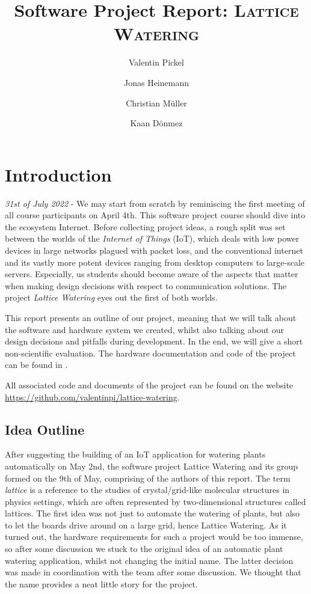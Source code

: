 \documentclass[acmtog, language=english, nonacm]{acmart}
\title{Software Project Report: \textsc{Lattice Watering}}
\author{Valentin Pickel}
\author{Jonas Heinemann}
\author{Christian Müller}
\author{Kaan Dönmez}
\affiliation{%
    \department[0]{Institute for Computer Science}%
    \institution{Freie Universität Berlin}%
    \city{Berlin}%
    \country{Germany}}
\begin{document}
    \maketitle

    \section{Introduction}

    \emph{31st of July 2022} - We may start from scratch by reminiscing the first meeting of all course participants on April 4th. This software project course should dive into the ecosystem Internet. Before collecting project ideas, a rough split was set between the worlds of the \emph{Internet of Things} (IoT), which deals with low power devices in large networks plagued with packet loss, and the conventional internet and its vastly more potent devices ranging from desktop computers to large-scale servers. Especially, us students should become aware of the aspects that matter when making design decisions with respect to communication solutions. The project \emph{Lattice Watering} eyes out the first of both worlds.

    This report presents an outline of our project, meaning that we will talk about the software and hardware system we created, whilst also talking about our design decisions and pitfalls during development. In the end, we will give a short non-scientific evaluation. The hardware documentation and code of the project can be found in \cite{lattice-watering}.

    All associated code and documents of the project can be found on the website \url{https://github.com/valentinpi/lattice-watering}.

    \subsection{Idea Outline}

    After suggesting the building of an IoT application for watering plants automatically on May 2nd, the software project Lattice Watering and its group formed on the 9th of May, comprising of the authors of this report. The term \emph{lattice} is a reference to the studies of crystal/grid-like molecular structures in physics settings, which are often represented by two-dimensional structures called lattices. The first idea was not just to automate the watering of plants, but also to let the boards drive around on a large grid, hence Lattice Watering. As it turned out, the hardware requirements for such a project would be too immense, so after some discussion we stuck to the original idea of an automatic plant watering application, whilst not changing the initial name. The latter decision was made in coordination with the team after some discussion. We thought that the name provides a neat little story for the project.
\end{document}
